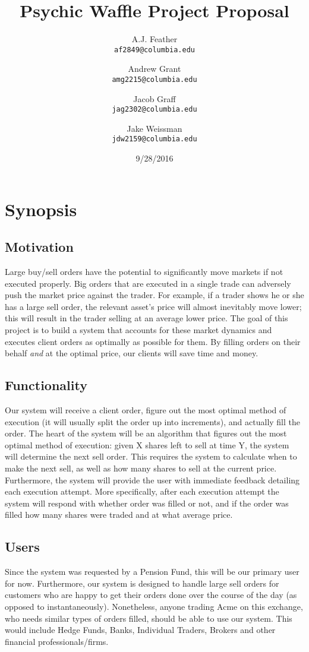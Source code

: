 \documentclass{article}
\title{Psychic Waffle Project Proposal}
\author{
	A.J. Feather\\
	\texttt{af2849@columbia.edu}
	\and
	Andrew Grant\\
	\texttt{amg2215@columbia.edu}
	\and
	Jacob Graff\\
	\texttt{jag2302@columbia.edu}
	\and
	Jake Weissman\\
	\texttt{jdw2159@columbia.edu}
}
\date{9/28/2016}
\begin{document}
\maketitle

\section{Synopsis}

\subsection{Motivation}
Large buy/sell orders have the potential to significantly move markets if not executed properly. Big orders that are executed in a single trade can adversely push the market price against the trader. For example, if a trader shows he or she has a large sell order, the relevant asset's price will almost inevitably move lower; this will result in the trader selling at an average lower price. The goal of this project is to build a system that accounts for these market dynamics and executes client orders as optimally as possible for them. By filling orders on their behalf \emph{and} at the optimal price, our clients will save time and money. 

\subsection{Functionality} %
Our system will receive a client order, figure out the most optimal method of execution (it will usually split the order up into increments), and actually fill the order. The heart of the system will be an algorithm that figures out the most optimal method of execution: given X shares left to sell at time Y, the system will determine the next sell order. This requires the system to calculate when to make the next sell, as well as how many shares to sell at the current price. Furthermore, the system will provide the user with immediate feedback detailing each execution attempt. More specifically, after each execution attempt the system will respond with whether order was filled or not, and if the order was filled how many shares were traded and at what average price. 

\subsection{Users}
Since the system was requested by a Pension Fund, this will be our primary user for now. Furthermore, our system is designed to handle large sell orders for customers who are happy to get their orders done over the course of the day (as opposed to instantaneously). Nonetheless, anyone trading Acme on this exchange, who needs similar types of orders filled, should be able to use our system. This would include Hedge Funds, Banks, Individual Traders, Brokers and other financial professionals/firms. 
\end{document}
